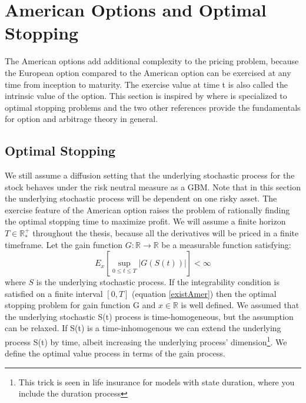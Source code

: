 
\section{American Options and Optimal Stopping}\label{AmericanOptions}
The American options add additional complexity to the pricing problem, because the European option compared to the American option can be exercised at any time from inception to maturity. The exercise value at time t is also called the intrinsic value of the option. This section is inspired by \parencite{finKont, Shiryaev06,Elliott99} where \parencite{Shiryaev06} is specialized to optimal stopping problems and the two other references provide the fundamentals for option and arbitrage theory in general.

\subsection{Optimal Stopping}
We still assume a diffusion setting that the underlying stochastic process for the stock behaves under the risk neutral measure as a GBM. Note that in this section the underlying stochastic process will be dependent on one risky asset. The exercise feature of the American option raises the problem of rationally finding the optimal stopping time to maximize profit. We will assume a finite horizon $T\in \mathbb{R}_*^+$ throughout the thesis, because all the derivatives will be priced in a finite timeframe. Let the gain function $G:\mathbb{R}\to \mathbb{R}$ be a measurable function satisfying:
\begin{equation}\label{existAmer}
E_{x}[\sup_{0\leq t \leq T}|G(S(t))|] < \infty
\end{equation}
where $S$ is the underlying stochastic process. If the integrability condition is satisfied on a finite interval $[0,T]$ (equation \eqref{existAmer}) then the optimal stopping problem for gain function G and $x \in \mathbb{R}$ is well defined. We assumed that the underlying stochastic S(t) process is time-homogeneous, but the assumption can be relaxed. If S(t) is a time-inhomogenous we can extend the underlying process S(t) by time, albeit increasing the underlying process' dimension\footnote{This trick is seen in life insurance for models with state duration, where you include the duration process}. We define the optimal value process in terms of the gain process.

